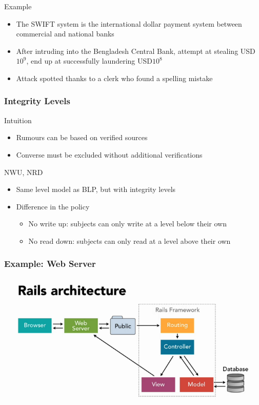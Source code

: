 \begin{reveals}
\begin{frame}
  \vfill

  \begin{block}{Example}
    \begin{itemize}
    \item The SWIFT system is the international dollar payment system between commercial and national banks
    \item After intruding into the Bengladesh Central Bank, attempt at
      stealing USD\(10^9\), end up at successfully laundering 
      USD\(10^8\)
    \item Attack spotted thanks to a clerk who found a spelling mistake
    \end{itemize}
  \end{block}

\end{frame}



\begin{frame}
  \frametitle{Integrity Levels}
 
  \begin{block}{Intuition}
    \begin{itemize}
    \item Rumours can be based on verified sources
    \item Converse must be excluded without additional verifications
    \end{itemize}
  \end{block}

  \begin{block} {NWU, NRD} 
    \begin{itemize}
    \item Same level model as BLP, but with integrity levels
    \item Difference in the policy
      \begin{itemize}
      \item No write up: subjects can only write at a level below their own
      \item No read down: subjects can only read at a level above their own
      \end{itemize}
    \end{itemize}
  \end{block}


\end{frame}

\begin{frame}
  \frametitle{Example: Web Server}

  \begin{center}
    \includegraphics[width=.7\textwidth]{images/rails-arch.png}
  \end{center}


\end{frame}
\end{reveals}
